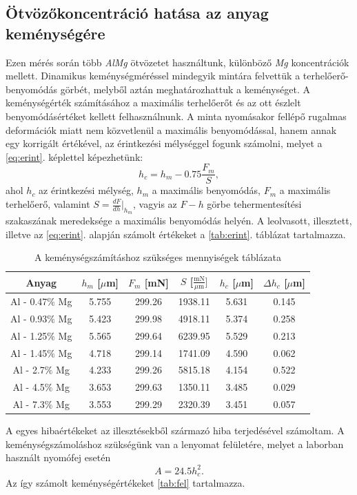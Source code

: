 \documentclass[12pt,a4paper]{article}
\begin{document}
\subsection{Ötvözőkoncentráció hatása az anyag keménységére}
\hspace*{10pt} Ezen mérés során több \emph{AlMg} ötvözetet használtunk, különböző \emph{Mg} koncentrációk mellett. Dinamikus keménységméréssel mindegyik mintára felvettük a terhelőerő-benyomódás görbét, melyből aztán meghatározhattuk a keménységet. A keménységérték számításához a maximális terhelőerőt és az ott észlelt benyomódásértéket kellett felhasználnunk. A minta nyomásakor fellépő rugalmas deformációk miatt nem közvetlenül a maximális benyomódással, hanem annak egy korrigált értékével, az érintkezési mélységgel fogunk számolni, melyet a \ref{eq:erint}. képlettel képezhetünk:
\begin{equation}
h_c=h_m-0.75\frac{F_m}{S},
\label{eq:erint}
\end{equation}
ahol $h_c$ az érintkezési mélység, $h_m$ a maximális benyomódás, $F_m$ a maximális terhelőerő, valamint $S=\frac{dF}{dh}|_{h_m}$, vagyis az $F-h$ görbe tehermentesítési szakaszának meredeksége a maximális benyomódás helyén. A leolvasott, illesztett, illetve az \ref{eq:erint}. alapján számolt értékeket a \ref{tab:erint}. táblázat tartalmazza.\\
\begin{table}[!h]
\begin{center}
\begin{tabular}{|c|c|c|c|c|c|}
\hline
Anyag & $h_m$ [$\mu$m] & $F_m$ [mN] & $S$ [$\frac{\textrm{mN}}{\mu \textrm{m}}]$ & $h_c$ [$\mu$m] & $\Delta h_c$ [$\mu$m]\\
\hline
Al - 0.47$\%$ Mg & 5.755 & 299.26 & 1938.11 & 5.631 & 0.145\\ 
\hline
Al - 0.93$\%$ Mg & 5.423 & 299.98 & 4918.11 & 5.374 & 0.258 \\
\hline
Al - 1.25$\%$ Mg & 5.565 & 299.64 & 6239.95 & 5.529 & 0.213\\ 
\hline
Al - 1.45$\%$ Mg & 4.718 & 299.14 & 1741.09 & 4.590 & 0.062\\
\hline
Al - 2.7$\%$ Mg & 4.233 & 299.26 & 5815.18 & 4.154 & 0.522 \\
\hline
Al - 4.5$\%$ Mg & 3.653 & 299.63 & 1350.11 & 3.485 & 0.029 \\
\hline
Al - 7.3$\%$ Mg & 3.553 &  
299.29 & 2320.39 & 3.451 & 0.057 \\
\hline
\end{tabular}
\caption{A keménységszámításhoz szükséges mennyiségek táblázata}
\end{center}
\end{table}
\newline
A egyes hibaértékeket az illesztésekből származó hiba terjedésével számoltam. A keménységszámoláshoz szükségünk van a lenyomat felületére, melyet a laborban használt nyomófej esetén 
\begin{equation}
A=24.5h_c^2.
\label{eq:fel}
\end{equation}
Az így számolt keménységértékeket \ref{tab:fel} tartalmazza.\\
\end{document}
